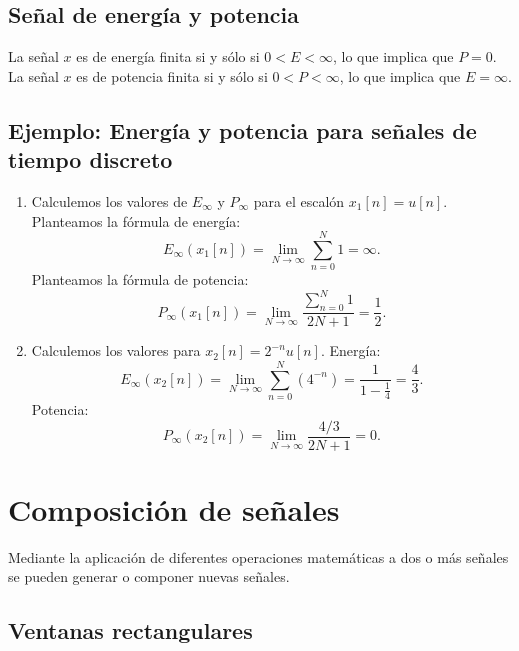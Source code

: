 \documentclass[11pt,a4paper,openany]{book}
\begin{document}
\subsection{Señal de energía y potencia}
La señal $x$ es de energía finita si y sólo si $0 < E < \infty$, lo que implica que $P = 0$. La señal $x$ es de potencia finita si y sólo si $0 < P < \infty$, lo que implica que $E = \infty$.

\subsection{Ejemplo: Energía y potencia para señales de tiempo discreto}

\begin{enumerate}
	\item Calculemos los valores de $E_{\infty }$ y $P_{\infty }$ para el escalón $x_{1}[n]=u[n]$.
	Planteamos la fórmula de energía:
	\begin{equation}
		E_{\infty }(x_{1}[n]) = \lim_{N \rightarrow \infty} \sum_{n=0}^{N} 1 = \infty.
	\end{equation}
	Planteamos la fórmula de potencia:
	\begin{equation}
		P_{\infty }(x_{1}[n]) = \lim_{N \rightarrow \infty} \frac{\sum_{n=0}^{N} 1}{2N+1} = \frac{1}{2}.
	\end{equation}
	
	\item Calculemos los valores para $x_{2}[n] = 2^{-n}u[n]$.
	Energía:
	\begin{equation}
		E_{\infty }(x_{2}[n]) = \lim_{N \rightarrow \infty} \sum_{n=0}^{N} \left(4^{-n}\right) = \frac{1}{1-\frac{1}{4}} = \frac{4}{3}.
	\end{equation}
	Potencia:
	\begin{equation}
		P_{\infty }(x_{2}[n]) = \lim_{N \rightarrow \infty} \frac{4/3}{2N+1} = 0.
	\end{equation}
\end{enumerate}
	
\section{Composición de señales}

Mediante la aplicación de diferentes operaciones matemáticas a
dos o más señales se pueden generar o componer nuevas señales.

\subsection{Ventanas rectangulares}
\end{document}
